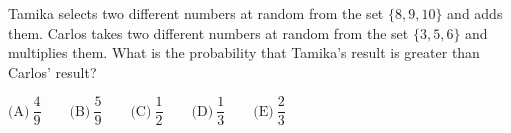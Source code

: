 Tamika selects two different numbers at random from the set $\{8,9,10\}$ and adds them. Carlos takes two different numbers at random from the set $\{3,5,6\}$ and multiplies them. What is the probability that Tamika's result is greater than Carlos' result?

$\text{(A)}\ \dfrac{4}{9}\qquad\text{(B)}\ \dfrac{5}{9}\qquad\text{(C)}\ \dfrac{1}{2}\qquad\text{(D)}\ \dfrac{1}{3}\qquad\text{(E)}\ \dfrac{2}{3}$
